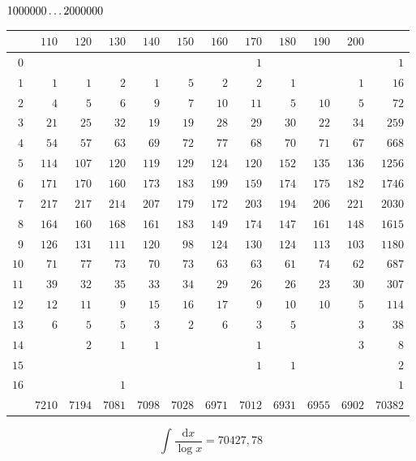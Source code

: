\clearpage
\noindent\begin{minipage}{\linewidth}\centering
{}
\(1000000\mathinner{.\,.\,.}2000000\)\par\smallskip
\begingroup\fontsize{10}{10.5}\selectfont\setlength{\tabcolsep}{3.5pt}\renewcommand{\arraystretch}{1}
\begin{tabular}{r|rrrrrrrrrr|r}\hline
 & $110$ & $120$ & $130$ & $140$ & $150$ & $160$ & $170$ & $180$ & $190$ & $200$ &  \\ \hline
$0$ &  &  &  &  &  &  & $1$ &  &  &  & $1$ \\
$1$ & $1$ & $1$ & $2$ & $1$ & $5$ & $2$ & $2$ & $1$ &  & $1$ & $16$ \\
$2$ & $4$ & $5$ & $6$ & $9$ & $7$ & $10$ & $11$ & $5$ & $10$ & $5$ & $72$ \\
$3$ & $21$ & $25$ & $32$ & $19$ & $19$ & $28$ & $29$ & $30$ & $22$ & $34$ & $259$ \\
$4$ & $54$ & $57$ & $63$ & $69$ & $72$ & $77$ & $68$ & $70$ & $71$ & $67$ & $668$ \\
$5$ & $114$ & $107$ & $120$ & $119$ & $129$ & $124$ & $120$ & $152$ & $135$ & $136$ & $1256$ \\
$6$ & $171$ & $170$ & $160$ & $173$ & $183$ & $199$ & $159$ & $174$ & $175$ & $182$ & $1746$ \\
$7$ & $217$ & $217$ & $214$ & $207$ & $179$ & $172$ & $203$ & $194$ & $206$ & $221$ & $2030$ \\
$8$ & $164$ & $160$ & $168$ & $161$ & $183$ & $149$ & $174$ & $147$ & $161$ & $148$ & $1615$ \\
$9$ & $126$ & $131$ & $111$ & $120$ & $98$ & $124$ & $130$ & $124$ & $113$ & $103$ & $1180$ \\
$10$ & $71$ & $77$ & $73$ & $70$ & $73$ & $63$ & $63$ & $61$ & $74$ & $62$ & $687$ \\
$11$ & $39$ & $32$ & $35$ & $33$ & $34$ & $29$ & $26$ & $26$ & $23$ & $30$ & $307$ \\
$12$ & $12$ & $11$ & $9$ & $15$ & $16$ & $17$ & $9$ & $10$ & $10$ & $5$ & $114$ \\
$13$ & $6$ & $5$ & $5$ & $3$ & $2$ & $6$ & $3$ & $5$ &  & $3$ & $38$ \\
$14$ &  & $2$ & $1$ & $1$ &  &  & $1$ &  &  & $3$ & $8$ \\
$15$ &  &  &  &  &  &  & $1$ & $1$ &  &  & $2$ \\
$16$ &  &  & $1$ &  &  &  &  &  &  &  & $1$ \\
\hline
 & $7210$ & $7194$ & $7081$ & $7098$ & $7028$ & $6971$ & $7012$ & $6931$ & $6955$ & $6902$ & $70382$ \\ \hline
\end{tabular}\par\endgroup
\setlength{\abovedisplayskip}{6pt}\setlength{\belowdisplayskip}{4pt}
\[\int\frac{\mathrm{d}x}{\log x}=70427{,}78\]
\end{minipage}\par

